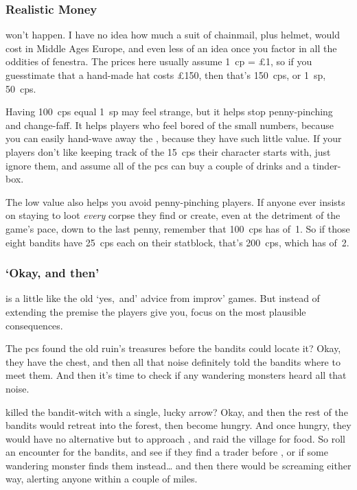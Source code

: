 \begin{multicols}{2}
\subsubsection{Realistic Money}
won't happen.
I have no idea how much a suit of chainmail, plus helmet, would cost in Middle Ages Europe, and even less of an idea once you factor in all the oddities of \gls{fenestra}.
The prices here usually assume 1~\gls{cp} = \pounds1, so if you guesstimate that a hand-made hat costs \pounds150, then that's 150~\glspl{cp}, or 1~\gls{sp}, 50~\glspl{cp}.

Having 100~\glspl{cp} equal 1~\gls{sp} may feel strange, but it helps stop penny-pinching and change-faff.
It helps players who feel bored of the small numbers, because you can easily hand-wave away the , because they have such little value.
If your players don't like keeping track of the 15~\glspl{cp} their character starts with, just ignore them, and assume all of the \glspl{pc} can buy a couple of drinks and a tinder-box.

The low value also helps you avoid penny-pinching players.
If anyone ever insists on staying to loot \emph{every} corpse they find or create, even at the detriment of the game's pace, down to the last penny, remember that 100~\glspl{cp} has  of~1.
So if those eight bandits have 25~\glspl{cp} each on their statblock, that's 200~\glspl{cp}, which has  of~2.

\subsubsection{`Okay, and then'}
is a little like the old `yes,~and' advice from improv' games.
But instead of extending the premise the players give you, focus on the most plausible consequences.

The \glspl{pc} found the old ruin's treasures before the bandits could locate it?
Okay, they have the chest, and then all that noise definitely told the bandits where to meet them.
And then it's time to check if any wandering \glspl{monster} heard all that noise.

 killed the bandit-\gls{witch} with a single, lucky arrow?
Okay, and then the rest of the bandits would retreat into the forest, then become hungry.
And once hungry, they would have no alternative but to approach , and raid the \gls{village} for food.
So roll an encounter for the bandits, and see if they find a trader before , or if some wandering \gls{monster} finds them instead\ldots
and then there would be screaming either way, alerting anyone within a couple of miles.


\end{multicols}
